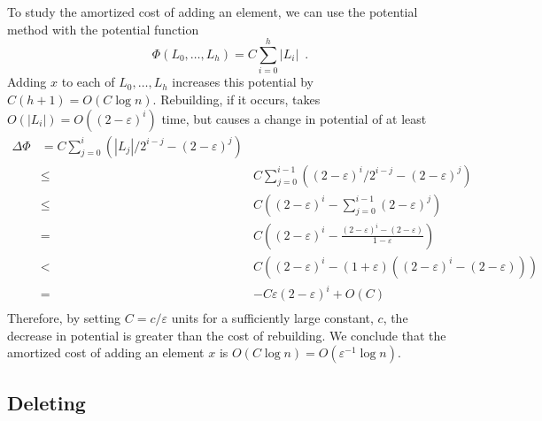 \documentclass[12pt]{patmorin}
\newcommand{\eps}{\varepsilon}
\begin{document}
To study the amortized cost of adding an element, we
can use the potential method with the potential function
\[
    \Phi(L_0,\ldots,L_h)=C\sum_{i=0}^h|L_i| \enspace .
\]
Adding $x$ to each of $L_0,\ldots,L_h$ increases this potential by
$C(h+1)=O(C\log n)$.  Rebuilding, if it occurs, takes $O(|L_i|)=O((2-\eps)^i)$
time, but causes a change in potential of at least
\begin{eqnarray*}
     \Delta\Phi & = C\sum_{j=0}^i\left(|L_j|/2^{i-j} - (2-\eps)^j\right) \\
          & \le & C\sum_{j=0}^{i-1}\left((2-\eps)^i/2^{i-j} - (2-\eps)^j\right) \\
          & \le & C\left((2-\eps)^i - \sum_{j=0}^{i-1}(2-\eps)^j\right) \\
          & = & C\left((2-\eps)^i - \frac{(2-\eps)^i-(2-\eps)}{1-\eps}\right) \\
          & < & C\left((2-\eps)^i - (1+\eps)\left((2-\eps)^i-(2-\eps)\right)\right)
            \\
          & = & -C\eps(2-\eps)^i + O(C) \\
\end{eqnarray*}
Therefore, by setting $C=c/\eps$ units for a sufficiently large constant,
$c$, the decrease in potential is greater than the cost of rebuilding.
We conclude that the amortized cost of adding an element $x$ is $O(C\log
n)=O(\eps^{-1}\log n)$.

\subsection{Deleting}
\end{document}
